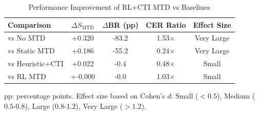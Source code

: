 \begin{table}[!t]
\centering
\caption{Performance Improvement of RL+CTI MTD vs Baselines}
\label{tab:improvement}
\renewcommand{\arraystretch}{1.1}
\begin{tabular}{@{}lcccc@{}}
\toprule
\textbf{Comparison} & $\Delta S_{\mathrm{MTD}}$ & $\Delta$\textbf{BR (pp)} & \textbf{CER Ratio} & \textbf{Effect Size} \\
\midrule
vs No MTD & +0.320 & -83.2 & 1.53$\times$ & Very Large \\
vs Static MTD & +0.186 & -55.2 & 0.24$\times$ & Very Large \\
vs Heuristic+CTI & +0.022 & -0.4 & 0.48$\times$ & Small \\
vs RL MTD & +-0.000 & -0.0 & 1.03$\times$ & Small \\
\bottomrule
\end{tabular}
\vspace{1mm}
\footnotesize{pp: percentage points. Effect size based on Cohen's $d$: Small ($<0.5$), Medium ($0.5$-$0.8$), Large ($0.8$-$1.2$), Very Large ($>1.2$).}
\end{table}
